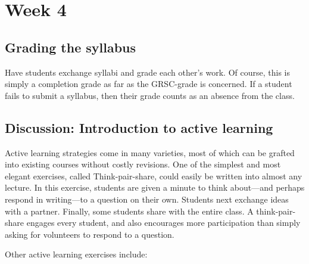 
\section{Week 4}
\label{sec:week-4}

\subsection{Grading the syllabus}
\label{sec:grading-syllabus}

Have students exchange syllabi and grade each other's work.  Of course, this is simply a completion grade as far as the GRSC-grade is concerned.  If a student fails to submit a syllabus, then their grade counts as an absence from the class.

\subsection{Discussion: Introduction to active learning}
\label{sec:discussion}

Active learning strategies come in many varieties, most of which can be grafted into existing courses without costly revisions. One of the simplest and most elegant exercises, called Think-pair-share, could easily be written into almost any lecture. In this exercise, students are given a minute to think about—and perhaps respond in writing—to a question on their own.  Students next exchange ideas with a partner.  Finally, some students share with the entire class. A think-pair-share engages every student, and also encourages more participation than simply asking for volunteers to respond to a question.

Other active learning exercises include:

